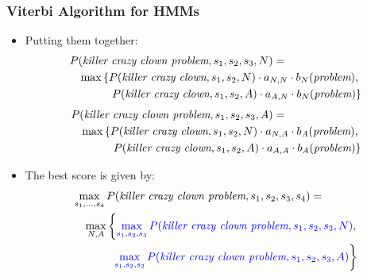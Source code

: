 \begin{frame}
\frametitle{Viterbi Algorithm for HMMs}
\begin{itemize}[<+->]
\item Putting them together:
\begin{eqnarray*}
\lefteqn{P(\textit{killer crazy clown problem}, s_1, s_2, s_3, N) =} \\
&& \max \left\{ P(\textit{killer crazy clown}, s_1, s_2, N) \cdot a_{N,N} \cdot b_N(\textit{problem}), \right. \\
&&  \left. P(\textit{killer crazy clown}, s_1, s_2, A) \cdot a_{A,N} \cdot b_N(\textit{problem}) \right\}
\end{eqnarray*}
\begin{eqnarray*}
\lefteqn{P(\textit{killer crazy clown problem}, s_1, s_2, s_3, A) =} \\
&& \max \left\{ P(\textit{killer crazy clown}, s_1, s_2, N) \cdot a_{N,A} \cdot b_A(\textit{problem}), \right. \\
&&  \left. P(\textit{killer crazy clown}, s_1, s_2, A) \cdot a_{A,A} \cdot b_A(\textit{problem}) \right\}
\end{eqnarray*}
\item The best score is given by:
\begin{eqnarray*}
\lefteqn{\max_{s_1, \ldots, s_4} P(\textit{killer crazy clown problem}, s_1, s_2, s_3, s_4) =} \\
&& \max_{N,A} \left\{ {\color{blue}  \max_{s_1, s_2, s_3} P(\textit{killer crazy clown problem}, s_1, s_2, s_3, N),  } \right. \\
&&  \left. {\color{blue}  \max_{s_1, s_2, s_3} P(\textit{killer crazy clown problem}, s_1, s_2, s_3, A) } \right\} 
\end{eqnarray*}
\end{itemize}
\end{frame}


